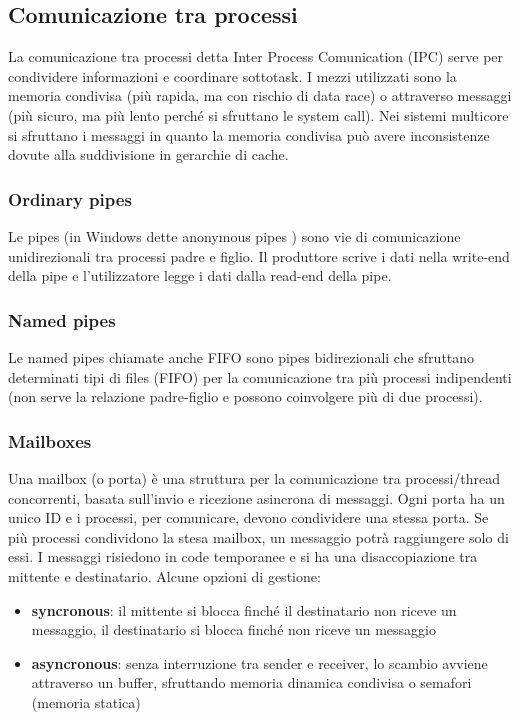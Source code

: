 \documentclass[a4paper]{article}
\begin{document}
\subsection{Comunicazione tra processi}
La comunicazione tra processi detta Inter Process Comunication (IPC) serve per condividere informazioni e coordinare sottotask.
I mezzi utilizzati sono la memoria condivisa (più rapida, ma con rischio di data race) o attraverso messaggi (più sicuro, ma più
lento perché si sfruttano le system call). Nei sistemi multicore si sfruttano i messaggi in quanto la memoria condivisa può
avere inconsistenze dovute alla suddivisione in gerarchie di cache.

\subsubsection*{Ordinary pipes}
Le pipes (in Windows dette anonymous pipes ) sono vie di comunicazione unidirezionali tra processi padre e figlio. Il produttore
scrive i dati nella write-end della pipe e l'utilizzatore legge i dati dalla read-end della pipe.

\subsubsection*{Named pipes}
Le named pipes chiamate anche FIFO sono pipes bidirezionali che sfruttano determinati tipi di files (FIFO) per la comunicazione
tra più processi indipendenti (non serve la relazione padre-figlio e possono coinvolgere più di due processi).

\subsubsection*{Mailboxes}
Una mailbox (o porta) è una struttura per la comunicazione tra processi/thread concorrenti, basata sull’invio e ricezione
asincrona di messaggi. Ogni porta ha un unico ID e i processi, per comunicare, devono condividere una stessa porta. Se più
processi condividono la stesa mailbox, un messaggio potrà raggiungere solo di essi. I messaggi risiedono in code temporanee e
si ha una disaccopiazione tra mittente e destinatario. Alcune opzioni di gestione:
\begin{itemize}
	\item \textbf{syncronous}: il mittente si blocca finché il destinatario non riceve un messaggio, il destinatario si blocca
	finché non riceve un messaggio
	\item \textbf{asyncronous}: senza interruzione tra sender e receiver, lo scambio avviene attraverso un buffer, sfruttando
	memoria dinamica condivisa o semafori (memoria statica)
\end{itemize}
\end{document}
